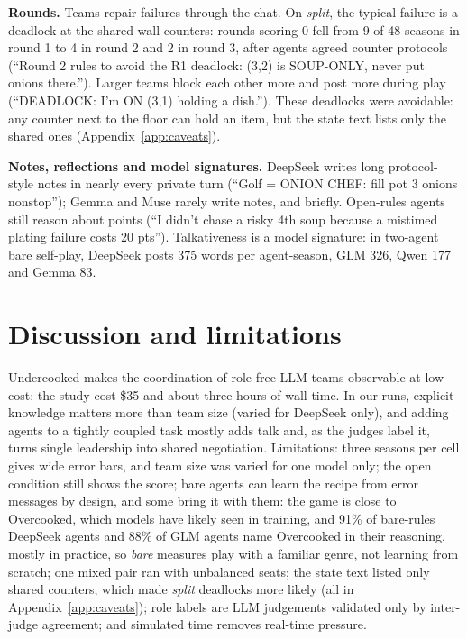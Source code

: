 \documentclass{article}
\begin{document}
\textbf{Rounds.} Teams repair failures through the chat. On \emph{split}, the typical failure is a deadlock at the shared wall counters: rounds scoring 0 fell from 9 of 48 seasons in round 1 to 4 in round 2 and 2 in round 3, after agents agreed counter protocols (``Round 2 rules to avoid the R1 deadlock: (3,2) is SOUP-ONLY, never put onions there.''). Larger teams block each other more and post more during play (``DEADLOCK: I'm ON (3,1) holding a dish.''). These deadlocks were avoidable: any counter next to the floor can hold an item, but the state text lists only the shared ones (Appendix~\ref{app:caveats}).

\textbf{Notes, reflections and model signatures.} DeepSeek writes long protocol-style notes in nearly every private turn (``Golf = ONION CHEF: fill pot 3 onions nonstop''); Gemma and Muse rarely write notes, and briefly. Open-rules agents still reason about points (``I didn't chase a risky 4th soup because a mistimed plating failure costs 20 pts''). Talkativeness is a model signature: in two-agent bare self-play, DeepSeek posts 375 words per agent-season, GLM 326, Qwen 177 and Gemma 83.

\section{Discussion and limitations}\label{sec:limits}
Undercooked makes the coordination of role-free LLM teams observable at low cost: the study cost \$35 and about three hours of wall time. In our runs, explicit knowledge matters more than team size (varied for DeepSeek only), and adding agents to a tightly coupled task mostly adds talk and, as the judges label it, turns single leadership into shared negotiation. Limitations: three seasons per cell gives wide error bars, and team size was varied for one model only; the open condition still shows the score; bare agents can learn the recipe from error messages by design, and some bring it with them: the game is close to Overcooked, which models have likely seen in training, and 91\% of bare-rules DeepSeek agents and 88\% of GLM agents name Overcooked in their reasoning, mostly in practice, so \emph{bare} measures play with a familiar genre, not learning from scratch; one mixed pair ran with unbalanced seats; the state text listed only shared counters, which made \emph{split} deadlocks more likely (all in Appendix~\ref{app:caveats}); role labels are LLM judgements validated only by inter-judge agreement; and simulated time removes real-time pressure.
\end{document}

